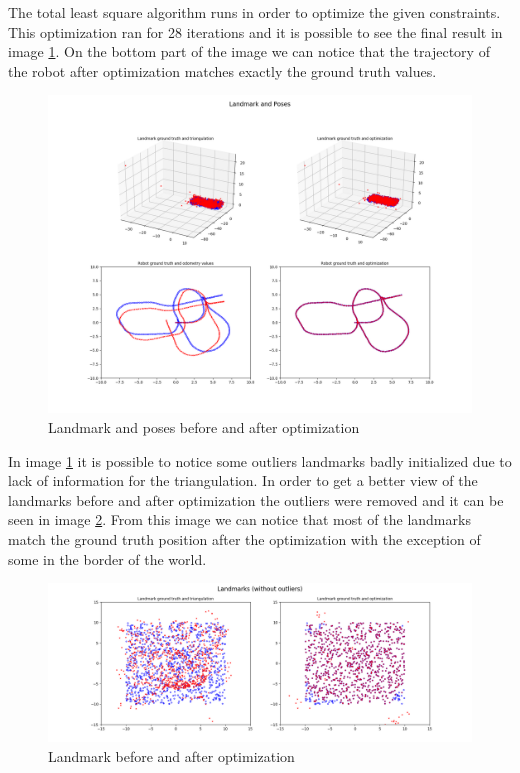 \documentclass{article}
\begin{document}
The total least square algorithm runs in order to optimize the given constraints. This optimization ran for 28 iterations and it is possible to see the final result in image \ref{fig:landmark_and_pose}. On the bottom part of the image we can notice that the trajectory of the robot after optimization matches exactly the ground truth values.

\begin{figure}
  \includegraphics[scale=0.3]{landmark_and_pose.png}
  \centering
  \caption{Landmark and poses before and after optimization}
  \label{fig:landmark_and_pose}
\end{figure}

In image \ref{fig:landmark_and_pose} it is possible to notice some outliers landmarks badly initialized due to lack of information for the triangulation. In order to get a better view of the landmarks before and after optimization the outliers were removed and it can be seen in image \ref{fig:landmark_optimized}. From this image we can notice that most of the landmarks match the ground truth position after the optimization with the exception of some in the border of the world.

\begin{figure}
  \includegraphics[scale=0.3]{landmarks_optimized.png}
  \centering
  \caption{Landmark before and after optimization}
  \label{fig:landmark_optimized}
\end{figure}
\end{document}
